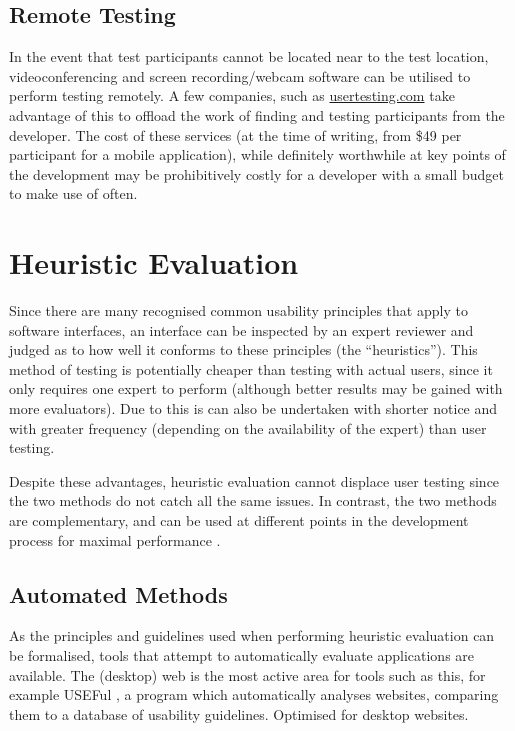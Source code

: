 \subsection{Remote Testing}

In the event that test participants cannot be located near to the test
location, videoconferencing and screen recording/webcam software can be
utilised to perform testing remotely. A few companies, such as
\url{usertesting.com} take advantage of this to offload the work of finding and
testing participants from the developer.  The cost of these services (at the
time of writing, from \$49 per participant for a mobile application), while
definitely worthwhile at key points of the development may be prohibitively
costly for a developer with a small budget to make use of often.

\section{Heuristic Evaluation}

Since there are many recognised common usability principles that apply to
software interfaces, an interface can be inspected by an expert reviewer and
judged as to how well it conforms to these principles (the ``heuristics'').
This method of testing is potentially cheaper than testing with actual users,
since it only requires one expert to perform (although better results may be
gained with more evaluators).  Due to this is can also be undertaken with
shorter notice and with greater frequency (depending on the availability of the
expert) than user testing.

Despite these advantages, heuristic evaluation cannot displace user testing
since the two methods do not catch all the same issues. In contrast, the two
methods are complementary, and can be used at different points in the
development process for maximal performance \cite{tan2009web, archer2010web}.

\subsection{Automated Methods}

As the principles and guidelines used when performing heuristic evaluation can
be formalised, tools that attempt to automatically evaluate applications are
available. The (desktop) web is the most active area for tools such as this,
for example USEFul \cite{dingli2011useful}, a program which automatically 
analyses websites, comparing them to a database of usability guidelines. Optimised
for desktop websites.

